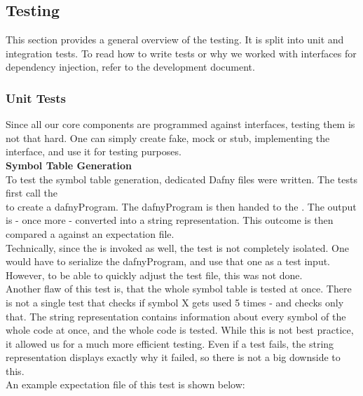 \subsection{Testing}

This section provides a general overview of the testing.
It is split into unit and integration tests.
To read how to write tests or why we worked with interfaces for dependency injection, refer to the development document.

\subsubsection{Unit Tests}
Since all our core components are programmed against interfaces, testing them is not that hard.
One can simply create fake, mock or stub, implementing the interface, and use it for testing purposes.\\

\textbf{Symbol Table Generation}\\
To test the symbol table generation, dedicated Dafny files were written.
The tests first call the \\
 to create a dafnyProgram.
The dafnyProgram is then handed to the .
The output is - once more - converted into a string representation.
This outcome is then compared a against an expectation file.\\

Technically, since the  is invoked as well, the test is not completely isolated.
One would have to serialize the dafnyProgram, and use that one as a test input.
However, to be able to quickly adjust the test file, this was not done.\\

Another flaw of this test is, that the whole symbol table is tested at once.
There is not a single test that checks if symbol X gets used 5 times - and checks only that.
The string representation contains information about every symbol of the whole code at once, and the whole code is tested.
While this is not best practice, it allowed us for a much more efficient testing.
Even if a test fails, the string representation displays exactly why it failed, so there is not a big downside to this.\\

An example expectation file of this test is shown below:


